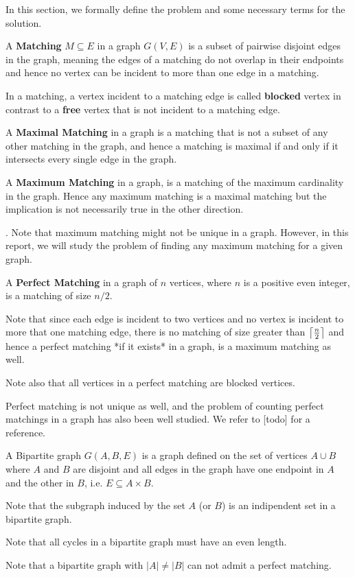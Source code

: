 In this section, we formally define the problem and some necessary terms for the solution.

\begin{definition}
A \textbf{Matching} $M \subseteq E$ in a graph $G(V, E)$ is a subset of pairwise disjoint edges in the graph, meaning the edges of a matching do not overlap in their endpoints and hence no vertex can be incident to more than one edge in a matching.
\end{definition}
In a matching, a vertex incident to a matching edge is called \textbf{blocked} vertex in contrast to a \textbf{free} vertex that is not incident to a matching edge.

\begin{definition}
A \textbf{Maximal Matching} in a graph is a matching that is not a subset of any other matching in the graph, and hence a matching is maximal if and only if it intersects every single edge in the graph.
\end{definition}

\begin{definition}
A \textbf{Maximum Matching} in a graph, is a matching of the maximum cardinality in the graph. Hence any maximum matching is a maximal matching but the implication is not necessarily true in the other direction.
\end{definition}.
Note that maximum matching might not be unique in a graph. However, in this report, we will study the problem of finding any maximum matching for a given graph.

\begin{definition}
A \textbf{Perfect Matching} in a graph of $n$ vertices, where $n$ is a positive even integer, is a matching of size $n/2$.
\end{definition}
Note that since each edge is incident to two vertices and no vertex is incident to more that one matching edge, there is no matching of size greater than $\ceil*{ \frac{n}{2}}$ and hence a perfect matching *if it exists* in a graph, is a maximum matching as well.

Note also that all vertices in a perfect matching are blocked vertices.

Perfect matching is not unique as well, and the problem of counting perfect matchings in a graph has also been well studied. We refer to [todo] for a reference.

\begin{definition}
	A Bipartite graph $G(A,B,E)$ is a graph defined on the set of vertices $A \cup B$ where $A$ and $B$ are disjoint and all edges in the graph have one endpoint in $A$ and the other in $B$, i.e. $E \subseteq A \times B$.
\end{definition}
Note that the subgraph induced by the set $A$ (or $B$) is an indipendent set in a bipartite graph.

Note that all cycles in a bipartite graph must have an even length.

Note that a bipartite graph with $|A| \neq |B|$ can not admit a perfect matching.

